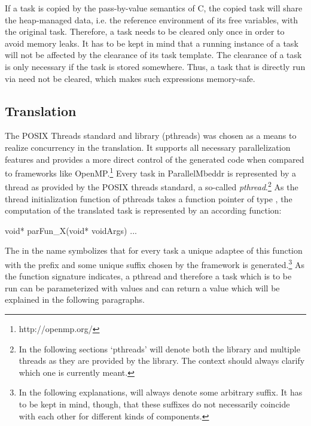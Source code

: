 If a task is copied by the pass-by-value semantics of C, the copied task will share the heap-managed data, i.e. the reference environment of its free variables, with the original task. Therefore, a task needs to be cleared only once in order to avoid memory leaks. It has to be kept in mind that a running instance of a task will not be affected by the clearance of its task template. The clearance of a task is only necessary if the task is stored somewhere. Thus, a task that is directly run via  need not be cleared, which makes such expressions memory-safe.

\subsection{Translation}
\label{tasksTranslation}
The POSIX Threads standard and library (pthreads) was chosen as a means to realize concurrency in the translation. It supports all necessary parallelization features and provides a more direct control of the generated code when compared to frameworks like OpenMP.\footnote{http://openmp.org/} Every task in ParallelMbeddr is represented by a thread as provided by the POSIX threads standard, a so-called \textit{pthread}.\footnote{In the following sections `pthreads' will denote both the library and multiple threads as they are provided by the library. The context should always clarify which one is currently meant.} As the thread initialization function of pthreads takes a function pointer of type , the computation of the translated task is represented by an according function:
\begin{ccode}
void* parFun_X(void* voidArgs) {...}
\end{ccode}

The  in the name symbolizes that for every task a unique adaptee of this function with the prefix  and some unique suffix chosen by the framework is generated.\footnote{In the following explanations,  will always denote some arbitrary suffix. It has to be kept in mind, though, that these suffixes do not necessarily coincide with each other for different kinds of components.} As the function signature indicates, a pthread and therefore a task which is to be run can be parameterized with values and can return a value which will be explained in the following paragraphs.

